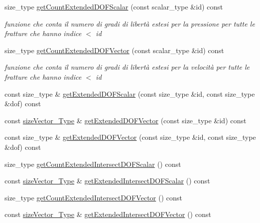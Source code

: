 \begin{DoxyCompactItemize}
\item 
size\-\_\-type \hyperlink{classMeshHandler_a15243aa9754c8b96f35f49d16cee4c1e}{get\-Count\-Extended\-D\-O\-F\-Scalar} (const scalar\-\_\-type \&id) const 
\begin{DoxyCompactList}\small\item\em funzione che conta il numero di gradi di libertà estesi per la pressione per tutte le fratture che hanno indice $<$ id \end{DoxyCompactList}\item 
size\-\_\-type \hyperlink{classMeshHandler_a31feb5b56638ea15982435239f196d7d}{get\-Count\-Extended\-D\-O\-F\-Vector} (const scalar\-\_\-type \&id) const 
\begin{DoxyCompactList}\small\item\em funzione che conta il numero di gradi di libertà estesi per la velocità per tutte le fratture che hanno indice $<$ id \end{DoxyCompactList}\item 
const size\-\_\-type \& \hyperlink{classMeshHandler_a6011a3ef304f58d262c1f94a60a7146d}{get\-Extended\-D\-O\-F\-Scalar} (const size\-\_\-type \&id, const size\-\_\-type \&dof) const 
\item 
const \hyperlink{Core_8h_a83c51913d041a5001e8683434c09857f}{size\-Vector\-\_\-\-Type} \& \hyperlink{classMeshHandler_af0e395f252eaa17da529279389a8b70a}{get\-Extended\-D\-O\-F\-Vector} (const size\-\_\-type \&id) const 
\item 
const size\-\_\-type \& \hyperlink{classMeshHandler_a758ccd3a35b85628d241dc528e773446}{get\-Extended\-D\-O\-F\-Vector} (const size\-\_\-type \&id, const size\-\_\-type \&dof) const 
\item 
size\-\_\-type \hyperlink{classMeshHandler_acdc0169a2f27d56c390c83c913cc2004}{get\-Count\-Extended\-Intersect\-D\-O\-F\-Scalar} () const 
\item 
const \hyperlink{Core_8h_a83c51913d041a5001e8683434c09857f}{size\-Vector\-\_\-\-Type} \& \hyperlink{classMeshHandler_a6b64278aa62abcf620d3583d7c006036}{get\-Extended\-Intersect\-D\-O\-F\-Scalar} () const 
\item 
size\-\_\-type \hyperlink{classMeshHandler_a703d9e9f870b3802d8159aa0da398216}{get\-Count\-Extended\-Intersect\-D\-O\-F\-Vector} () const 
\item 
const \hyperlink{Core_8h_a83c51913d041a5001e8683434c09857f}{size\-Vector\-\_\-\-Type} \& \hyperlink{classMeshHandler_a32a3e4114f8f64d8d49c8d8d579a5e13}{get\-Extended\-Intersect\-D\-O\-F\-Vector} () const 
\item 

\end{DoxyCompactItemize}
